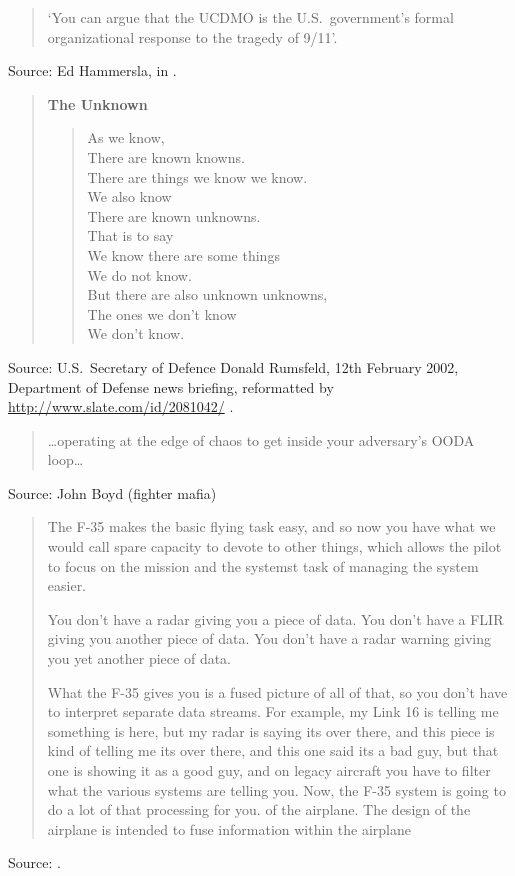 \documentclass[a4paper]{article}
\begin{document}
\begin{quote}
	`You can argue that the UCDMO is the U.S.\ government's formal organizational response to the
tragedy of 9/11'.
\end{quote}
Source: Ed Hammersla, in \citet{Edwards2011}.
\medskip

\begin{quote}
	\textbf{The Unknown}
	\begin{verse}
		As we know, \\
		There are known knowns. \\
		There are things we know we know. \\
		We also know \\
		There are known unknowns. \\
		That is to say \\
		We know there are some things \\
		We do not know. \\
		But there are also unknown unknowns, \\
		The ones we don't know \\
		We don't know.\\
	\end{verse}
\end{quote}
Source: U.S.\ Secretary of Defence Donald Rumsfeld, 12th February 2002, Department of Defense news
briefing, reformatted by \url{http://www.slate.com/id/2081042/} \citep{Schwartz2010a}.
\medskip

\begin{quote}
	\ldots operating at the edge of chaos to get inside your adversary's OODA loop\ldots
\end{quote}
Source: John Boyd (fighter mafia)
\medskip

\begin{quotation}
	The F-35 makes the basic flying task easy, and so now you have what we would call spare
capacity to devote to other things, which allows the pilot to focus on the mission and the systemst
task of managing the system easier.

You don't have a radar giving you a piece of data.  You don't have a FLIR giving you another piece
of data.  You don't have a radar warning giving you yet another piece of data.

What the F-35 gives you is a fused picture of all of that, so you don't have to interpret separate
data streams.  For example, my Link 16 is telling me something is here, but my radar is saying its
over there, and this piece is kind of telling me its over there, and this one said its a bad guy,
but that one is showing it as a good guy, and on legacy aircraft you have to filter what the
various systems are telling you.  Now, the F-35 system is going to do a lot of that processing for
you.
of the airplane.  The design of the airplane is intended to fuse information within the airplane 
\end{quotation}
Source: \citet{Schenck2011}.
\medskip
\end{document}
